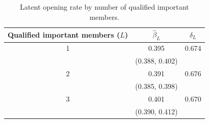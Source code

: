 \begin{table}[t]
  \centering
  \caption{Latent opening rate by number of qualified important members.}
  \label{tab:mean_reversion}
\begin{tabular}{ccc}
\toprule
\shortstack{Qualified important\\members ($L$)} & $\hat{\beta}_L$ & $\hat{\delta}_L$ \\
\midrule
1 & 0.395 & 0.674 \\
  & (0.388, 0.402) & \\
2 & 0.391 & 0.676 \\
  & (0.385, 0.398) & \\
3 & 0.401 & 0.670 \\
  & (0.390, 0.412) & \\
\bottomrule
\end{tabular}
\end{table}
